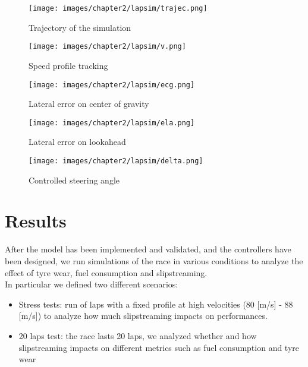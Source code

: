 \documentclass{report}
\begin{document}
\begin{figure}[h!]
    \centering
    \texttt{[image: images/chapter2/lapsim/trajec.png]}
    \caption{Trajectory of the simulation}
    \label{fig:latController_lapsim_trajec}
\end{figure}

\begin{figure}[h!]
    \centering
    \texttt{[image: images/chapter2/lapsim/v.png]}
    \caption{Speed profile tracking}
    \label{fig:latController_lapsim_v}
\end{figure}

\begin{figure}[h!]
    \centering
    \texttt{[image: images/chapter2/lapsim/ecg.png]}
    \caption{Lateral error on center of gravity}
    \label{fig:latController_lapsim_ecg}
\end{figure}

\begin{figure}[h!]
    \centering
    \texttt{[image: images/chapter2/lapsim/ela.png]}
    \caption{Lateral error on lookahead}
    \label{fig:latController_lapsim_ela}
\end{figure}

\begin{figure}[h!]
    \centering
    \texttt{[image: images/chapter2/lapsim/delta.png]}
    \caption{Controlled steering angle}
    \label{fig:latController_lapsim_delta}
\end{figure}

\chapter{Results}
After the model has been implemented and validated, and the controllers have been designed, we run simulations of the race in various conditions to analyze the effect of tyre wear, fuel consumption and slipstreaming. 
\\In particular we defined two different scenarios:
\begin{itemize}
    \item Stress tests: run of laps with a fixed profile at high velocities (80 [m/s] - 88 [m/s]) to analyze how much slipstreaming impacts on performances. 
    \item 20 laps test: the race lasts 20 laps, we analyzed whether and how slipstreaming impacts on different metrics such as fuel consumption and tyre wear
\end{itemize}
\end{document}
